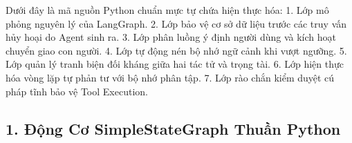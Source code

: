 Dưới đây là mã nguồn Python chuẩn mực tự chứa hiện thực hóa:
1. Lớp  mô phỏng nguyên lý của LangGraph.
2. Lớp  bảo vệ cơ sở dữ liệu trước các truy vấn hủy hoại do Agent sinh ra.
3. Lớp  phân luồng ý định người dùng và kích hoạt chuyển giao con người.
4. Lớp  tự động nén bộ nhớ ngữ cảnh khi vượt ngưỡng.
5. Lớp  quản lý tranh biện đối kháng giữa hai tác tử và trọng tài.
6. Lớp  hiện thực hóa vòng lặp tự phản tư với bộ nhớ phân tập.
7. Lớp  rào chắn kiểm duyệt cú pháp tĩnh bảo vệ Tool Execution.

\subsection{1. Động Cơ SimpleStateGraph Thuần Python}
